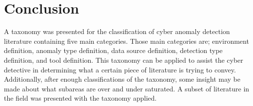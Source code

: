 \section{Conclusion}
A taxonomy was presented for the classification of cyber anomaly detection literature containing five main categories. 
Those main categories are; environment definition, anomaly type definition, data source definition, detection type definition, and tool definition. 
This taxonomy can be applied to assist the cyber detective in determining what a certain piece of literature is trying to convey. 
Additionally, after enough classifications of the taxonomy, some insight may be made about what subareas are over and under saturated. 
A subset of literature in the field was presented with the taxonomy applied. 